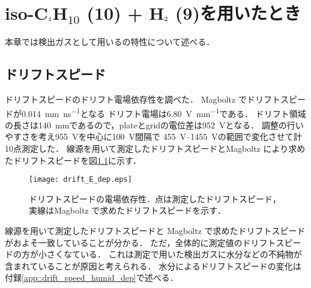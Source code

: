 \documentclass[../master]{subfiles}
\begin{document}
\chapter{iso-C$_{\text 4}$H$_{\text{10}}$ (10) + H$_{\text 2}$ (9)を用いたとき}
本章では検出ガスとして用いる\isoButaneHydro の特性について述べる．
\section{ドリフトスピード}
ドリフトスピードのドリフト電場依存性を調べた．
Magboltz でドリフトスピードが\SI{0.014}{\milli\metre\per\nano\second}となる
ドリフト電場は\SI{6.80}{\volt\per\milli\metre}である．
ドリフト領域の長さは\SI{140}{\milli\metre}であるので，plateとgridの電位差は\SI{952}{\volt}となる．
調整の行いやすさを考え\SI{955}{\volt}を中心に\SI{100}{\volt}間隔で
\SIrange{455}{1455}{\volt}の範囲で変化させて計10点測定した．
線源を用いて測定したドリフトスピードとMagboltz により求めたドリフトスピードを図\ref{fig::drift_speed_E_dep}に示す．
\begin{figure}
  \centering
  \texttt{[image: drift\_E\_dep.eps]}
  \caption{ドリフトスピードの電場依存性．点は測定したドリフトスピード，実線はMagboltz で求めたドリフトスピードを示す．}
  \label{fig::drift_speed_E_dep}
\end{figure}
線源を用いて測定したドリフトスピードと Magboltz で求めたドリフトスピードがおよそ一致していることが分かる．
ただ，全体的に測定値のドリフトスピードの方が小さくなている．
これは測定で用いた検出ガスに水分などの不純物が含まれていることが原因と考えられる．
水分によるドリフトスピードの変化は付録\ref{app::drift_speed_humid_dep}で述べる．
\end{document}
